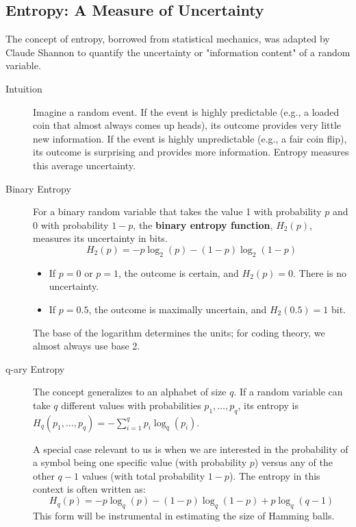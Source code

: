 \subsection{Entropy: A Measure of Uncertainty}

The concept of entropy, borrowed from statistical mechanics, was adapted by Claude Shannon to quantify the uncertainty or "information content" of a random variable.

\begin{description}
    \item[Intuition] Imagine a random event. If the event is highly predictable (e.g., a loaded coin that almost always comes up heads), its outcome provides very little new information. If the event is highly unpredictable (e.g., a fair coin flip), its outcome is surprising and provides more information. Entropy measures this average uncertainty.

    \item[Binary Entropy] For a binary random variable that takes the value 1 with probability $p$ and 0 with probability $1-p$, the \textbf{binary entropy function}, $H_2(p)$, measures its uncertainty in bits.
    \[
        H_2(p) = -p \log_2(p) - (1-p) \log_2(1-p)
    \]
    \begin{itemize}
        \item If $p=0$ or $p=1$, the outcome is certain, and $H_2(p) = 0$. There is no uncertainty.
        \item If $p=0.5$, the outcome is maximally uncertain, and $H_2(0.5) = 1$ bit.
    \end{itemize}
    The base of the logarithm determines the units; for coding theory, we almost always use base 2.

    \item[q-ary Entropy] The concept generalizes to an alphabet of size $q$. If a random variable can take $q$ different values with probabilities $p_1, \dots, p_q$, its entropy is $H_q(p_1, \dots, p_q) = -\sum_{i=1}^q p_i \log_q(p_i)$.
    
    A special case relevant to us is when we are interested in the probability of a symbol being one specific value (with probability $p$) versus any of the other $q-1$ values (with total probability $1-p$). The entropy in this context is often written as:
    \[
        H_q(p) = -p\log_q(p) - (1-p)\log_q(1-p) + p\log_q(q-1)
    \]
    This form will be instrumental in estimating the size of Hamming balls.
\end{description}

